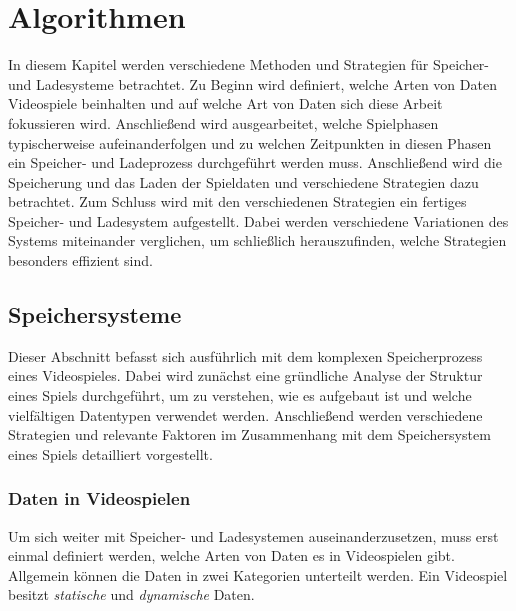 \chapter{Algorithmen}\label{ch:algorithmen}
In diesem Kapitel werden verschiedene Methoden und Strategien für Speicher- und Ladesysteme betrachtet. Zu Beginn wird definiert, welche Arten von Daten Videospiele beinhalten und auf welche Art von Daten sich diese Arbeit fokussieren wird. Anschließend wird ausgearbeitet, welche Spielphasen typischerweise aufeinanderfolgen und zu welchen Zeitpunkten in diesen Phasen ein Speicher- und Ladeprozess durchgeführt werden muss. Anschließend wird die Speicherung und das Laden der Spieldaten und verschiedene Strategien dazu betrachtet. Zum Schluss wird mit den verschiedenen Strategien ein fertiges Speicher- und Ladesystem aufgestellt. Dabei werden verschiedene Variationen des Systems miteinander verglichen, um schließlich herauszufinden, welche Strategien besonders effizient sind.




\section{Speichersysteme}\label{sect:speichersysteme}
Dieser Abschnitt befasst sich ausführlich mit dem komplexen Speicherprozess eines Videospieles. Dabei wird zunächst eine gründliche Analyse der Struktur eines Spiels durchgeführt, um zu verstehen, wie es aufgebaut ist und welche vielfältigen Datentypen verwendet werden. Anschließend werden verschiedene Strategien und relevante Faktoren im Zusammenhang mit dem Speichersystem eines Spiels detailliert vorgestellt.


\subsection{Daten in Videospielen}
Um sich weiter mit Speicher- und Ladesystemen auseinanderzusetzen, muss erst einmal definiert werden, welche Arten von Daten es in Videospielen gibt. Allgemein können die Daten in zwei Kategorien unterteilt werden. Ein Videospiel besitzt \textit{statische} und \textit{dynamische} Daten.

